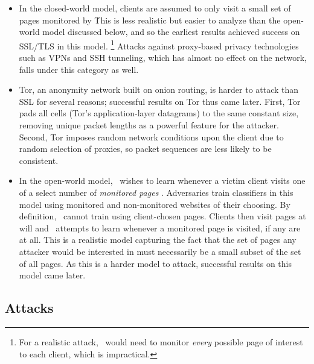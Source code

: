 \documentclass[runningheads]{llncs}
\begin{document}
\begin{itemize}
\item[(1)] In the closed-world model, clients are assumed to only visit a small set of pages monitored by \adv\.
This is less realistic but easier to analyze than the open-world model discussed below,
and so the earliest results achieved success on SSL/TLS in this model.
\footnote{For a realistic attack, \adv\ would need to
monitor \emph{every} possible page of interest to each client, which is impractical.}
Attacks against proxy-based privacy technologies such as VPNs and SSH tunneling,
which has almost no effect on the network, falls under this category as well.

\item[(2)] Tor, an anonymity network built on onion routing, is harder to attack than SSL for several reasons;
successful results on Tor thus came later.
First, Tor pads all cells (Tor's application-layer datagrams) to the same constant size,
removing unique packet lengths as a powerful feature for the attacker.
Second, Tor imposes random network conditions upon the client due to random selection of proxies,
so packet sequences are less likely to be consistent.

\item[(3)] In the open-world model, \adv\ wishes to learn whenever a victim
client visits one of a select number of \emph{monitored pages} \cite{wang2016website}. Adversaries train
classifiers in this model using monitored and non-monitored websites of their choosing. By
definition, \adv\ cannot train using client-chosen pages. Clients then visit pages at will
and \adv\ attempts to learn whenever a monitored page is visited, if any are at all.
This is a realistic model capturing the fact that the set of pages any attacker would be interested in must
necessarily be a small subset of the set of all pages.
As this is a harder model to attack, successful results on this model came later.
\end{itemize}

\subsection{Attacks}
\end{document}
